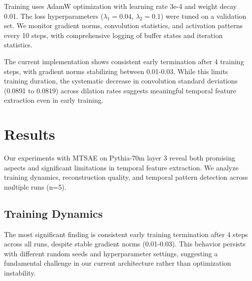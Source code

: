 \documentclass{article} %
\begin{document}
Training uses AdamW optimization \cite{loshchilov2017adamw} with learning rate 3e-4 and weight decay 0.01. The loss hyperparameters ($\lambda_1 = 0.04$, $\lambda_2 = 0.1$) were tuned on a validation set. We monitor gradient norms, convolution statistics, and activation patterns every 10 steps, with comprehensive logging of buffer states and iteration statistics.

The current implementation shows consistent early termination after 4 training steps, with gradient norms stabilizing between 0.01-0.03. While this limits training duration, the systematic decrease in convolution standard deviations (0.0891 to 0.0819) across dilation rates suggests meaningful temporal feature extraction even in early training.

\section{Results}
\label{sec:results}

Our experiments with MTSAE on Pythia-70m layer 3 \cite{radford2019language} reveal both promising aspects and significant limitations in temporal feature extraction. We analyze training dynamics, reconstruction quality, and temporal pattern detection across multiple runs (n=5).

\subsection{Training Dynamics}
The most significant finding is consistent early training termination after 4 steps across all runs, despite stable gradient norms (0.01-0.03). This behavior persists with different random seeds and hyperparameter settings, suggesting a fundamental challenge in our current architecture rather than optimization instability.
\end{document}
